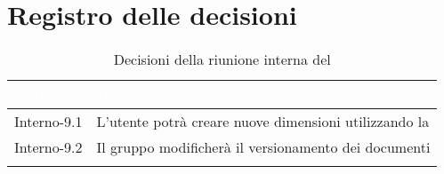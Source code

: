 \section{Registro delle decisioni}
{
\renewcommand{\arraystretch}{1.5}
\centering
\begin{longtable}{C{3cm} C{9cm}}
\textcolor{white}{\textbf{Codice}}&
\textcolor{white}{\textbf{Decisione}}\\	

\endhead
		
Interno-9.1 & L'utente potrà creare nuove dimensioni utilizzando la \textit{}\\
Interno-9.2 & Il gruppo modificherà il versionamento dei documenti\\
\caption{Decisioni della riunione interna del \Data{}}
\end{longtable}
}


